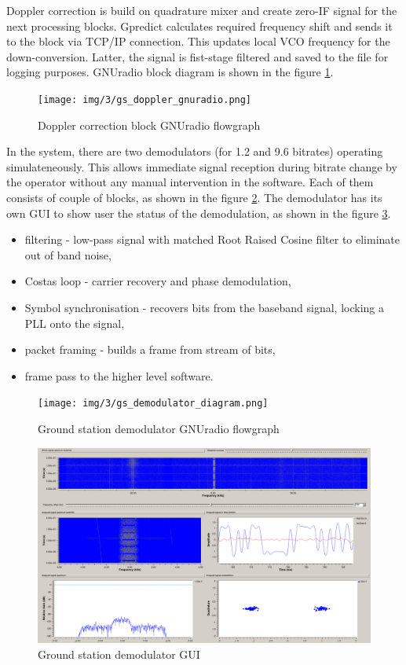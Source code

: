 Doppler correction is build on quadrature mixer and create zero-IF signal for the next processing blocks. Gpredict calculates required frequency shift and sends it to the block via TCP/IP connection. This updates local VCO frequency for the down-conversion. Latter, the signal is fist-stage filtered and saved to the file for logging purposes. GNUradio block diagram is shown in the figure \ref{gs_doppler_gnuradio}.

\begin{figure}[H]
    \centering
    \texttt{[image: img/3/gs\_doppler\_gnuradio.png]}
    \caption{Doppler correction block GNUradio flowgraph}
    \label{gs_doppler_gnuradio}
\end{figure}

In the system, there are two demodulators (for \SI{1.2}{\kbps} and \SI{9.6}{\kbps} bitrates) operating simulateneously. This allows immediate signal reception during bitrate change by the operator without any manual intervention in the software. Each of them consists of couple of blocks, as shown in the figure \ref{gs_demodulator_diagram}. The demodulator has its own GUI  to show user the status of the demodulation, as shown in the figure \ref{gs_demodulator_gui}.
\begin{itemize}
    \item filtering - low-pass signal with matched Root Raised Cosine filter to eliminate out of band noise,
    \item Costas loop - carrier recovery and phase demodulation,
    \item Symbol synchronisation - recovers bits from the baseband signal, locking a PLL onto the signal,
    \item packet framing - builds a frame from stream of bits,
    \item frame pass to the higher level software.
\end{itemize}

\begin{figure}[H]
    \centering
    \texttt{[image: img/3/gs\_demodulator\_diagram.png]}
    \caption{Ground station demodulator GNUradio flowgraph}
    \label{gs_demodulator_diagram}
\end{figure}

\begin{figure}[H]
    \centering
    \includegraphics[width=0.6\paperwidth]{img/3/gs_demodulator_gui.jpg}
    \caption{Ground station demodulator GUI}
    \label{gs_demodulator_gui}
\end{figure}


